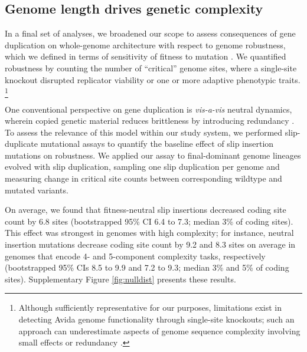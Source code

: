 \subsection{Genome length drives genetic complexity}



In a final set of analyses, we broadened our scope to assess consequences of gene duplication on whole-genome architecture with respect to genome robustness, which we defined in terms of sensitivity of fitness to mutation \citep{lenski1999genome}.
We quantified robustness by counting the number of ``critical'' genome sites, where a single-site knockout disrupted replicator viability or one or more adaptive phenotypic traits.%
\footnote{%
Although sufficiently representative for our purposes, limitations exist in detecting Avida genome functionality through single-site knockouts; such an approach can underestimate aspects of genome sequence complexity involving small effects or redundancy \citep{lenski1999genome,moreno2024cryptic}.
}

One conventional perspective on gene duplication is \textit{vis-a-vis} neutral dynamics, wherein copied genetic material reduces brittleness by introducing redundancy \citep{wagner1996genetic}.
To assess the relevance of this model within our study system, we performed slip-duplicate mutational assays to quantify the baseline effect of slip insertion mutations on robustness.
We applied our assay to final-dominant genome lineages evolved with slip duplication, sampling one slip duplication per genome and measuring change in critical site counts between corresponding wildtype and mutated variants.

On average, we found that fitness-neutral slip insertions decreased coding site count by 6.8 sites (bootstrapped 95\% CI 6.4 to 7.3; median 3\% of coding sites).
This effect was strongest in genomes with high complexity; for instance, neutral insertion mutations decrease coding site count by 9.2 and 8.3 sites on average in genomes that encode 4- and 5-component complexity tasks, respectively (bootstrapped 95\% CIs 8.5 to 9.9 and 7.2 to 9.3; median 3\% and 5\% of coding sites).
Supplementary Figure \ref{fig:nulldist} presents these results.


